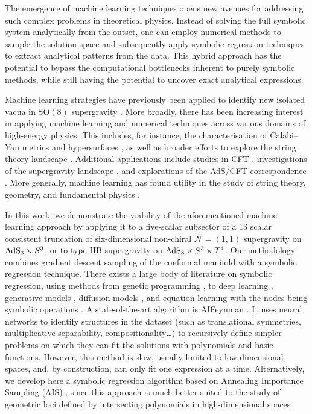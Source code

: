 \documentclass[11pt,a4paper]{article}
\begin{document}
The emergence of machine learning techniques opens new avenues for addressing such complex problems in theoretical physics. Instead of solving the full symbolic system analytically from the outset, one can employ numerical methods to sample the solution space and subsequently apply symbolic regression techniques to extract analytical patterns from the data. This hybrid approach has the potential to bypass the computational bottlenecks inherent to purely symbolic methods, while still having the potential to uncover exact analytical expressions.

Machine learning strategies have previously been applied to identify new isolated vacua in $\mathrm{SO}(8)$ supergravity \cite{Comsa:2019rcz,Berman:2022jqn}. More broadly, there has been increasing interest in applying machine learning and numerical techniques across various domains of high-energy physics. This includes, for instance, the characterisation of Calabi–Yau metrics and hypersurfaces \cite{Ashmore:2019wzb,Berman:2021mcw,Larfors:2022nep,Berglund:2022gvm,Jejjala:2020wcc,Douglas:2006rr,Larfors:2021pbb,He:2018jtw}, as well as broader efforts to explore the string theory landscape \cite{He:2017aed,Carifio:2017bov,Ruehle:2017mzq}. Additional applications include studies in CFT \cite{Chen:2020dxg}, investigations of the supergravity landscape \cite{Brady:2025zzi,Krishnan:2020sfg}, and explorations of the AdS/CFT correspondence \cite{Hashimoto:2018ftp}. More generally, machine learning has found utility in the study of string theory, geometry, and fundamental physics \cite{Ruehle:2020jrk,He:2023csq,Bao:2021auj}.

In this work, we demonstrate the viability of the aforementioned machine learning approach by applying it to a five-scalar subsector of a 13 scalar consistent truncation of six-dimensional non-chiral $\mathcal{N} = (1,1)$ supergravity on ${\rm AdS}_3 \times S^3$, or to type IIB supergravity on ${\rm AdS}_3 \times S^3 \times T^4$. Our methodology combines gradient descent sampling of the conformal manifold with a symbolic regression technique. There exists a large body of literature on symbolic regression, using methods from genetic programming \cite{koza1994genetic,virgolin2021improving,randall2022bingo,burlacu2019parsimony}, to deep learning \cite{petersen2019deep,kamienny2022end}, generative models \cite{valipour2021symbolicgpt}, diffusion models \cite{bastiani2025diffusion}, and equation learning with the nodes being symbolic operations \cite{2018arXiv180607259S}. A state-of-the-art algorithm is AIFeynman \cite{Udrescu:2019mnk}. It uses neural networks to identify structures in the dataset (such as translational symmetries, multiplicative separability, compositionality\dots) to recursively define simpler problems on which they can fit the solutions with polynomials and basic functions.  However, this method is slow, usually limited to low-dimensional spaces, and, by construction, can only fit one expression at a time. Alternatively, we develop here a symbolic regression algorithm based on Annealing Importance Sampling (AIS) \cite{neal1998annealedimportancesampling}, since this approach is much better suited to the study of geometric loci defined by intersecting polynomials in high-dimensional spaces
\end{document}
